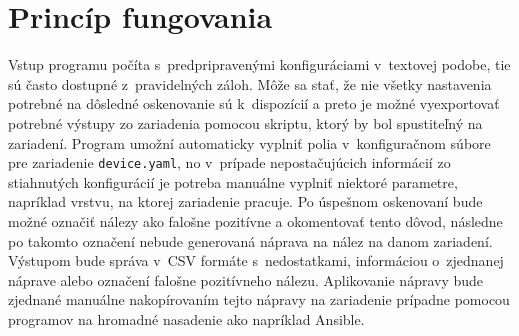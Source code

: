 \section{Princíp fungovania}

Vstup programu počíta s~predpripravenými konfiguráciami v~textovej podobe, tie sú často dostupné z~pravidelných záloh. Môže sa stať, že nie všetky nastavenia potrebné na dôsledné oskenovanie sú k~dispozícií a preto je možné vyexportovať potrebné výstupy zo zariadenia pomocou skriptu, ktorý by bol spustiteľný na zariadení. Program umožní automaticky vyplniť polia v~konfiguračnom súbore pre zariadenie \texttt{device.yaml}, no v~prípade nepostačujúcich informácií zo stiahnutých konfigurácií je potreba manuálne vyplniť niektoré parametre, napríklad vrstvu, na ktorej zariadenie pracuje. Po úspešnom oskenovaní bude možné označiť nálezy ako falošne pozitívne a okomentovať tento dôvod, následne po takomto označení nebude generovaná náprava na nález na danom zariadení. Výstupom bude správa v~CSV formáte s~nedostatkami, informáciou o~zjednanej náprave alebo označení falošne pozitívneho nálezu. Aplikovanie nápravy bude zjednané manuálne nakopírovaním tejto nápravy na zariadenie prípadne pomocou programov na hromadné nasadenie ako napríklad Ansible. 


